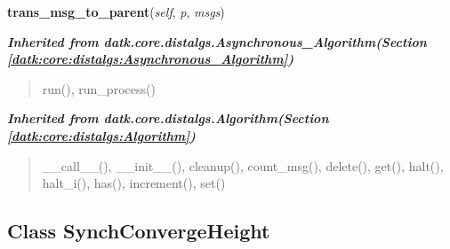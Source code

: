     \label{datk:core:algs:AsynchConvergecast:trans_msg_to_parent}

    \vspace{0.5ex}

\hspace{.8\funcindent}\begin{boxedminipage}{\funcwidth}

    \raggedright \textbf{trans\_msg\_to\_parent}(\textit{self}, \textit{p}, \textit{msgs})

\setlength{\parskip}{2ex}
\setlength{\parskip}{1ex}
    \end{boxedminipage}


\large{\textbf{\textit{Inherited from datk.core.distalgs.Asynchronous\_Algorithm\textit{(Section \ref{datk:core:distalgs:Asynchronous_Algorithm})}}}}

\begin{quote}
run(), run\_process()
\end{quote}

\large{\textbf{\textit{Inherited from datk.core.distalgs.Algorithm\textit{(Section \ref{datk:core:distalgs:Algorithm})}}}}

\begin{quote}
\_\_call\_\_(), \_\_init\_\_(), cleanup(), count\_msg(), delete(), get(), halt(), halt\_i(), has(), increment(), set()
\end{quote}


\subsection{Class SynchConvergeHeight}

